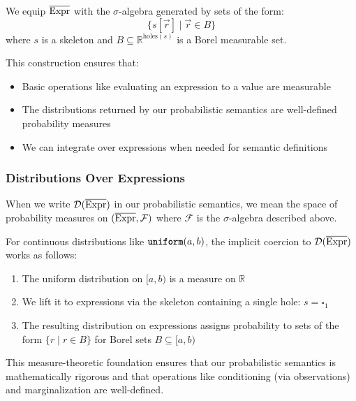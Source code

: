 We equip ${\overline{\textnormal{Expr}}}$ with the $\sigma$-algebra generated by sets of the form:
\[
\{s[\vec{r}] \mid \vec{r} \in B\}
\]
where $s$ is a skeleton and $B \subseteq \mathbb{R}^{\text{holes}(s)}$ is a Borel measurable set.

This construction ensures that:
\begin{itemize}
    \item Basic operations like evaluating an expression to a value are measurable
    \item The distributions returned by our probabilistic semantics are well-defined probability measures
    \item We can integrate over expressions when needed for semantic definitions
\end{itemize}

\subsubsection{Distributions Over Expressions}

When we write $\mathcal{D}({\overline{\textnormal{Expr}}})$ in our probabilistic semantics, we mean the space of probability measures on $({\overline{\textnormal{Expr}}}, \mathcal{F})$ where $\mathcal{F}$ is the $\sigma$-algebra described above.

For continuous distributions like $\textnormal{\ttfamily\bfseries uniform}(a, b)$, the implicit coercion to $\mathcal{D}({\overline{\textnormal{Expr}}})$ works as follows:
\begin{enumerate}
    \item The uniform distribution on $[a, b)$ is a measure on $\mathbb{R}$
    \item We lift it to expressions via the skeleton containing a single hole: $s = \square_1$
    \item The resulting distribution on expressions assigns probability to sets of the form $\{r \mid r \in B\}$ for Borel sets $B \subseteq [a, b)$
\end{enumerate}

This measure-theoretic foundation ensures that our probabilistic semantics is mathematically rigorous and that operations like conditioning (via observations) and marginalization are well-defined. 


